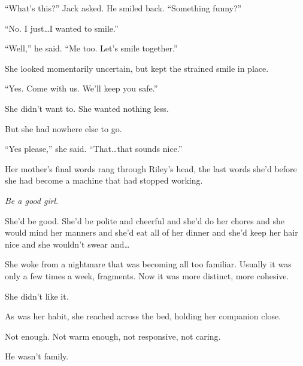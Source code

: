 ``What's this?'' Jack asked.  He smiled back.  ``Something funny?''



``No.  I just\ldots I wanted to smile.''



``Well,'' he said.  ``Me too.  Let's smile together.''



She looked momentarily uncertain, but kept the strained smile in place.



``Yes.  Come with us.  We'll keep you safe.''



She didn't want to.  She wanted nothing less.



But she had nowhere else to go.



``Yes please,'' she said.  ``That\ldots that sounds nice.''



Her mother's final words rang through Riley's head, the last words she'd before she had become a machine that had stopped working.



\emph{Be a good girl}.



She'd be good.  She'd be polite and cheerful and she'd do her chores and she would mind her manners and she'd eat all of her dinner and she'd keep her hair nice and she wouldn't swear and\ldots



\sectionbreak






She woke from a nightmare that was becoming all too familiar.  Usually it was only a few times a week, fragments.  Now it was more distinct, more cohesive.



She didn't like it.



As was her habit, she reached across the bed, holding her companion close.



Not enough.  Not warm enough, not responsive, not caring.



He wasn't family.




